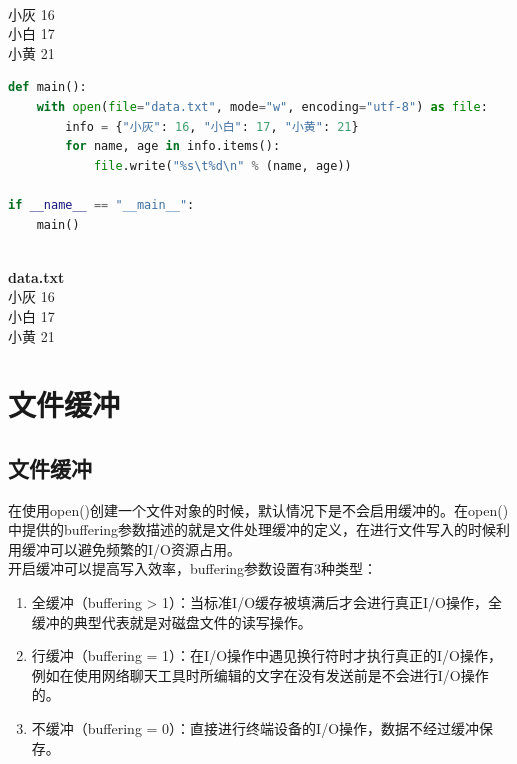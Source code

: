 \begin{tcolorbox}
	 \\
	小灰	16 \\
	小白	17 \\
	小黄	21
\end{tcolorbox}

\vspace{0.5cm}
\begin{lstlisting}[language=Python]
def main():
    with open(file="data.txt", mode="w", encoding="utf-8") as file:
        info = {"小灰": 16, "小白": 17, "小黄": 21}
        for name, age in info.items():
            file.write("%s\t%d\n" % (name, age))

if __name__ == "__main__":
    main()
\end{lstlisting}

\begin{tcolorbox}
	 \\
	\textbf{data.txt} \\
	小灰	16 \\
	小白	17 \\
	小黄	21
\end{tcolorbox}

\newpage

\section{文件缓冲}

\subsection{文件缓冲}

在使用open()创建一个文件对象的时候，默认情况下是不会启用缓冲的。在open()中提供的buffering参数描述的就是文件处理缓冲的定义，在进行文件写入的时候利用缓冲可以避免频繁的I/O资源占用。 \\

开启缓冲可以提高写入效率，buffering参数设置有3种类型：

\begin{enumerate}
	\item 全缓冲（buffering > 1）：当标准I/O缓存被填满后才会进行真正I/O操作，全缓冲的典型代表就是对磁盘文件的读写操作。

	\item 行缓冲（buffering = 1）：在I/O操作中遇见换行符时才执行真正的I/O操作，例如在使用网络聊天工具时所编辑的文字在没有发送前是不会进行I/O操作的。

	\item 不缓冲（buffering = 0）：直接进行终端设备的I/O操作，数据不经过缓冲保存。
\end{enumerate}

